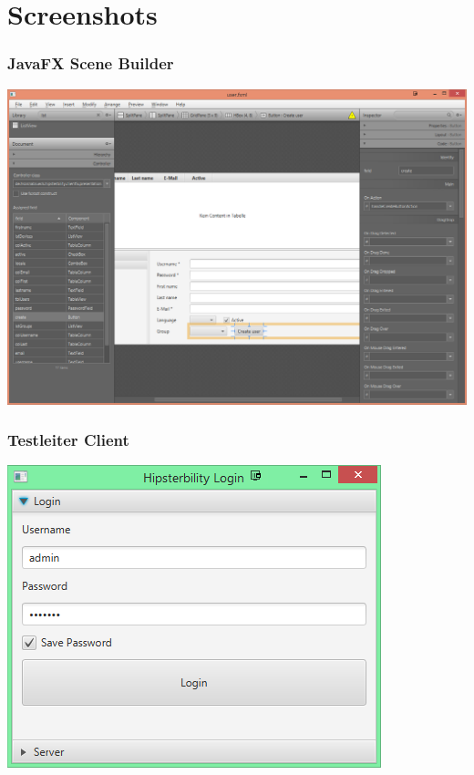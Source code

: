\section{Screenshots}

\subsubsection{JavaFX Scene Builder}
\begin{minipage}[t]{\textwidth}
	\includegraphics[width = \linewidth]{img/client/scene_builder}
	\label{fig:scenebuilder_screenshot}
\end{minipage}

\subsubsection{Testleiter Client}\label{appendix:screenshots_client}
\begin{minipage}[t]{\textwidth}
\centering
	\includegraphics{img/client/login}
	\label{fig:client_login}
\end{minipage}

